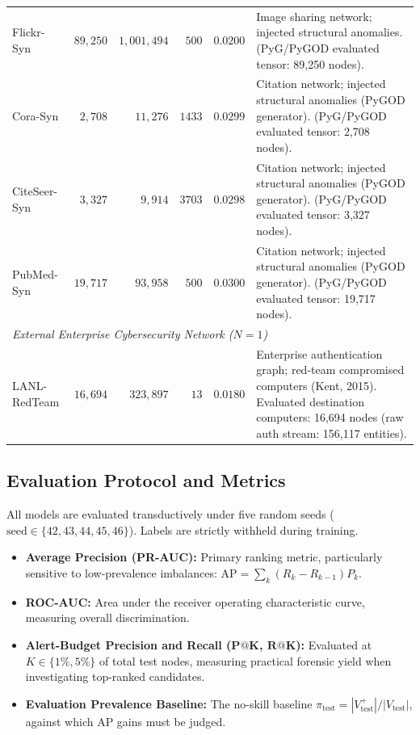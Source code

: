 \documentclass[11pt,a4paper]{article}
\begin{document}
\begin{table}[htbp]
\begin{tabularx}{\textwidth}{lrrrrX}
Flickr-Syn & $89,250$ & $1,001,494$ & $500$ & $0.0200$ & Image sharing network; injected structural anomalies. (PyG/PyGOD evaluated tensor: 89,250 nodes). \\
Cora-Syn & $2,708$ & $11,276$ & $1433$ & $0.0299$ & Citation network; injected structural anomalies (PyGOD generator). (PyG/PyGOD evaluated tensor: 2,708 nodes). \\
CiteSeer-Syn & $3,327$ & $9,914$ & $3703$ & $0.0298$ & Citation network; injected structural anomalies (PyGOD generator). (PyG/PyGOD evaluated tensor: 3,327 nodes). \\
PubMed-Syn & $19,717$ & $93,958$ & $500$ & $0.0300$ & Citation network; injected structural anomalies (PyGOD generator). (PyG/PyGOD evaluated tensor: 19,717 nodes). \\
\midrule
\multicolumn{6}{l}{\textit{External Enterprise Cybersecurity Network ($N=1$)}} \\
LANL-RedTeam & $16,694$ & $323,897$ & $13$ & $0.0180$ & Enterprise authentication graph; red-team compromised computers (Kent, 2015). Evaluated destination computers: 16,694 nodes (raw auth stream: 156,117 entities). \\
\bottomrule
\end{tabularx}
\end{table}

\subsection{Evaluation Protocol and Metrics}
All models are evaluated transductively under five random seeds ($\text{seed} \in \{42, 43, 44, 45, 46\}$). Labels are strictly withheld during training.
\begin{itemize}
    \item \textbf{Average Precision (PR-AUC):} Primary ranking metric, particularly sensitive to low-prevalence imbalances: $\mathrm{AP} = \sum_k (R_k - R_{k-1}) P_k$.
    \item \textbf{ROC-AUC:} Area under the receiver operating characteristic curve, measuring overall discrimination.
    \item \textbf{Alert-Budget Precision and Recall ($\mathbf{P@K}$, $\mathbf{R@K}$):} Evaluated at $K \in \{1\%, 5\%\}$ of total test nodes, measuring practical forensic yield when investigating top-ranked candidates.
    \item \textbf{Evaluation Prevalence Baseline:} The no-skill baseline $\pi_{\mathrm{test}} = |V_{\mathrm{test}}^+| / |V_{\mathrm{test}}|$, against which AP gains must be judged.
\end{itemize}
\end{document}
